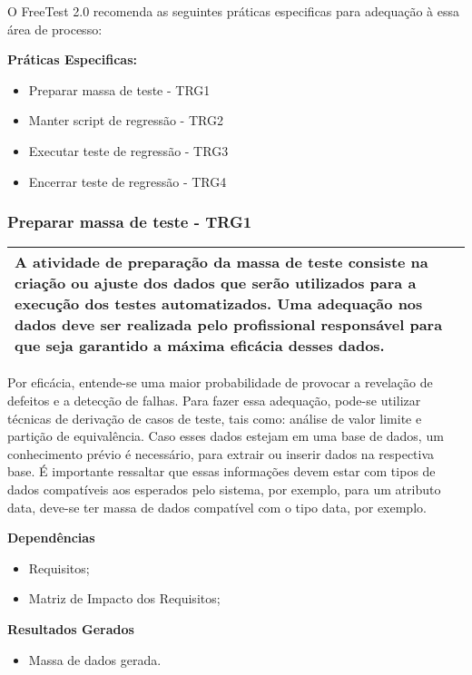 O FreeTest 2.0 recomenda as seguintes práticas especificas para adequação à essa área de processo:

\textbf{Práticas Especificas:}

\begin{itemize}    
    \item Preparar massa de teste - TRG1
    \item Manter script de regressão - TRG2
    \item Executar teste de regressão - TRG3
    \item Encerrar teste de regressão - TRG4
\end{itemize}

\subsubsection{Preparar massa de teste - TRG1}
\label{sec:trg1}

\begin{table}[H]
\centering
\begin{tabular}{|p{130mm}|}
\hline
A atividade de preparação da massa de teste consiste na criação ou ajuste dos dados que serão utilizados para a execução dos testes automatizados. Uma adequação nos dados deve ser realizada pelo profissional responsável para que seja garantido a máxima eficácia desses dados. \\ 
\hline
\end{tabular}
\end{table}

Por eficácia, entende-se uma maior probabilidade de provocar a revelação de defeitos e a detecção de falhas. Para fazer essa adequação, pode-se utilizar técnicas de derivação de casos de teste, tais como: análise de valor limite e partição de equivalência. Caso esses dados estejam em uma base de dados, um conhecimento prévio é necessário, para extrair ou inserir dados na respectiva base. É importante ressaltar que essas informações devem estar com tipos de dados compatíveis aos esperados pelo sistema, por exemplo, para um atributo data, deve-se ter massa de dados compatível com o tipo data, por exemplo.

\textbf{Dependências}
\begin{itemize}
    \item Requisitos;
    \item Matriz de Impacto dos Requisitos;
\end{itemize}

\textbf{Resultados Gerados}
\begin{itemize}
    \item Massa de dados gerada.
\end{itemize}

